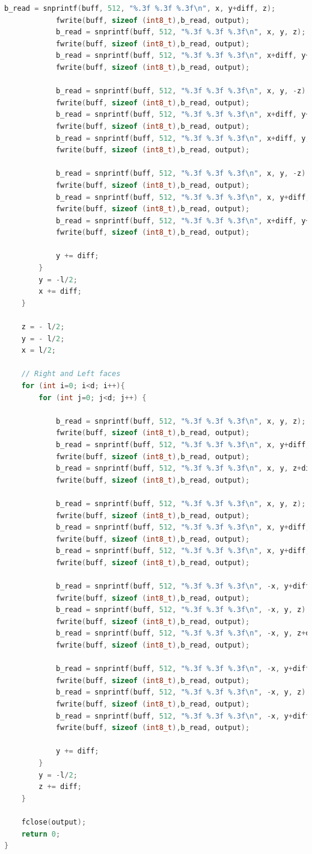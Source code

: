 \documentclass[14pt, a4 paper]{article}
\begin{document}
\begin{lstlisting}[language=c++]
			b_read = snprintf(buff, 512, "%.3f %.3f %.3f\n", x, y+diff, z);
			fwrite(buff, sizeof (int8_t),b_read, output);
			b_read = snprintf(buff, 512, "%.3f %.3f %.3f\n", x, y, z);
			fwrite(buff, sizeof (int8_t),b_read, output);
			b_read = snprintf(buff, 512, "%.3f %.3f %.3f\n", x+diff, y+diff, z);
			fwrite(buff, sizeof (int8_t),b_read, output);

			b_read = snprintf(buff, 512, "%.3f %.3f %.3f\n", x, y, -z);
			fwrite(buff, sizeof (int8_t),b_read, output);
			b_read = snprintf(buff, 512, "%.3f %.3f %.3f\n", x+diff, y+diff, -z);
			fwrite(buff, sizeof (int8_t),b_read, output);
			b_read = snprintf(buff, 512, "%.3f %.3f %.3f\n", x+diff, y, -z);
			fwrite(buff, sizeof (int8_t),b_read, output);

			b_read = snprintf(buff, 512, "%.3f %.3f %.3f\n", x, y, -z);
			fwrite(buff, sizeof (int8_t),b_read, output);
			b_read = snprintf(buff, 512, "%.3f %.3f %.3f\n", x, y+diff, -z);
			fwrite(buff, sizeof (int8_t),b_read, output);
			b_read = snprintf(buff, 512, "%.3f %.3f %.3f\n", x+diff, y+diff, -z);
			fwrite(buff, sizeof (int8_t),b_read, output);

			y += diff;
		}
		y = -l/2;
		x += diff;
	}
    
	z = - l/2;
	y = - l/2;
	x = l/2;

    // Right and Left faces
	for (int i=0; i<d; i++){
		for (int j=0; j<d; j++) {

			b_read = snprintf(buff, 512, "%.3f %.3f %.3f\n", x, y, z);
			fwrite(buff, sizeof (int8_t),b_read, output);
			b_read = snprintf(buff, 512, "%.3f %.3f %.3f\n", x, y+diff, z+diff);
			fwrite(buff, sizeof (int8_t),b_read, output);
			b_read = snprintf(buff, 512, "%.3f %.3f %.3f\n", x, y, z+diff);
			fwrite(buff, sizeof (int8_t),b_read, output);

			b_read = snprintf(buff, 512, "%.3f %.3f %.3f\n", x, y, z);
			fwrite(buff, sizeof (int8_t),b_read, output);
			b_read = snprintf(buff, 512, "%.3f %.3f %.3f\n", x, y+diff, z);
			fwrite(buff, sizeof (int8_t),b_read, output);
			b_read = snprintf(buff, 512, "%.3f %.3f %.3f\n", x, y+diff, z+diff);
			fwrite(buff, sizeof (int8_t),b_read, output);

			b_read = snprintf(buff, 512, "%.3f %.3f %.3f\n", -x, y+diff, z+diff);
			fwrite(buff, sizeof (int8_t),b_read, output);
			b_read = snprintf(buff, 512, "%.3f %.3f %.3f\n", -x, y, z);
			fwrite(buff, sizeof (int8_t),b_read, output);
			b_read = snprintf(buff, 512, "%.3f %.3f %.3f\n", -x, y, z+diff);
			fwrite(buff, sizeof (int8_t),b_read, output);

			b_read = snprintf(buff, 512, "%.3f %.3f %.3f\n", -x, y+diff, z);
			fwrite(buff, sizeof (int8_t),b_read, output);
			b_read = snprintf(buff, 512, "%.3f %.3f %.3f\n", -x, y, z);
			fwrite(buff, sizeof (int8_t),b_read, output);
			b_read = snprintf(buff, 512, "%.3f %.3f %.3f\n", -x, y+diff, z+diff);
			fwrite(buff, sizeof (int8_t),b_read, output);

			y += diff;
		}
		y = -l/2;
		z += diff;
	}

	fclose(output);
	return 0;
}
\end{lstlisting}
\end{document}
